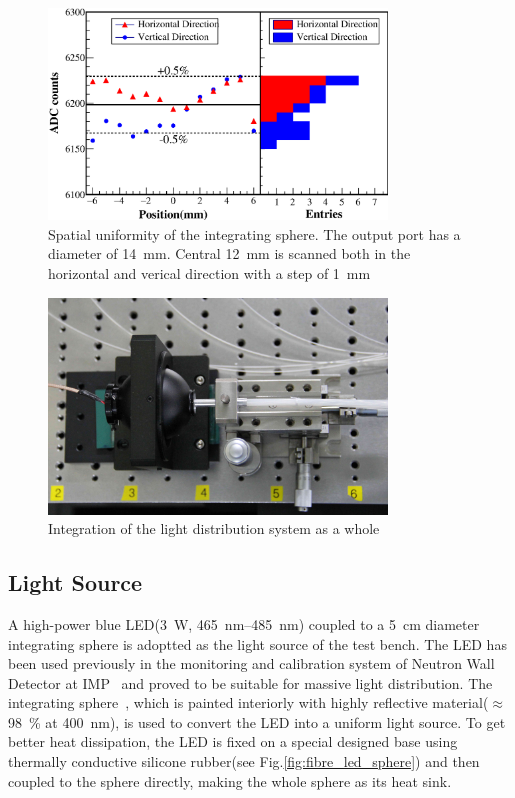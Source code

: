 \documentclass[review,number,sort&compress]{elsarticle}
\begin{document}
\begin{figure}
 \centering
 \includegraphics[width=90mm]{uniformity_integratingsphere}
\caption{Spatial uniformity of the integrating sphere.
The output port has a diameter of \SI{14}{\milli\meter}.
Central \SI{12}{\milli\meter} is scanned both in the horizontal and verical direction with a step of \SI{1}{\milli\meter}}
\label{fig:uniformity_integratingsphere}
\end{figure} 



\begin{figure}
 \centering
 \includegraphics[width=90mm]{light_source1_crop}
\caption{Integration of the light distribution system as a whole}
\label{fig:light_source}
\end{figure} 

\subsection{Light Source}
\label{sec:light_source}

A high-power blue LED(\SI{3}{\watt}, \SIrange{465}{485}{\nano\meter}) coupled to a \SI{5}{\centi\meter} diameter integrating sphere is adoptted as the light source of the test bench.
The LED has been used previously in the monitoring and calibration system of Neutron Wall Detector at IMP~\cite{yuyuhong_led} and proved to be suitable for massive light distribution.
The integrating sphere~\cite{integrating_sphere}, which is painted interiorly with highly reflective material($\approx$\SI{98}{\percent} at \SI{400}{\nano\meter}), is used to convert the LED into a uniform light source.
To get better heat dissipation, the LED is fixed on a special designed base using thermally conductive silicone rubber(see Fig.\ref{fig:fibre_led_sphere}) and then coupled to the sphere directly, making the whole sphere as its heat sink.
\end{document}
